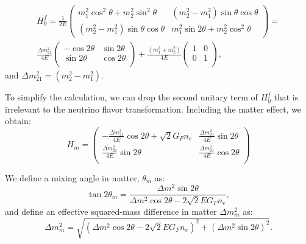 \begin{equation} \label{eq:H0f}
\begin{aligned}
 H^f_0 = \frac{1}{2E}\begin{pmatrix}m^2_1\cos^2\theta+m^2_2\sin^2\theta & (m^2_2-m^2_1)\sin\theta\cos\theta \\ (m^2_2-m^2_1)\sin\theta\cos\theta & m^2_1\sin2\theta+m^2_2\cos^2\theta\end{pmatrix} =
\\
\frac{\Delta m_{21}^2}{4E}\begin{pmatrix}
	-\cos 2\theta & \sin 2\theta\\
	\sin 2\theta & \cos 2\theta\\
\end{pmatrix}+\frac{(m_1^2+m_2^2)}{4E}\begin{pmatrix}
	1 & 0\\
	0 &1\\
\end{pmatrix},
\end{aligned}
\end{equation}
and $\Delta m^2_{21}=(m^2_2 - m^2_1)$.

To simplify the calculation, we can drop the second unitary term of $H^f_0$ that is irrelevant to the neutrino flavor transformation. Including the matter effect, we obtain:
\begin{equation}\label{eq:Hm}
	H_m = \begin{pmatrix}
		-\frac{\Delta m_{21}^2}{4E}\cos 2\theta+\sqrt 2G_Fn_e & \frac{\Delta m_{21}^2}{4E}\sin 2\theta\\
		\frac{\Delta m_{21}^2}{4E}\sin 2\theta &\frac{\Delta m_{21}^2}{4E}\cos 2\theta\\
	\end{pmatrix}
\end{equation}

We define a mixing angle in matter, $\theta_m$ as:
\begin{equation}\label{eq:thetaM}
	\tan 2\theta_m = \frac{\Delta m^2\sin2\theta}{\Delta m^2\cos2\theta-2\sqrt 2E G_Fn_e},
\end{equation}
and define an effective squared-mass difference in matter $\Delta m^2_m$ as:
\begin{equation}
	\Delta m^2_m = \sqrt{(\Delta m^2\cos2\theta - 2\sqrt 2EG_Fn_e)^2+(\Delta m^2\sin2\theta)^2}.
\end{equation}

